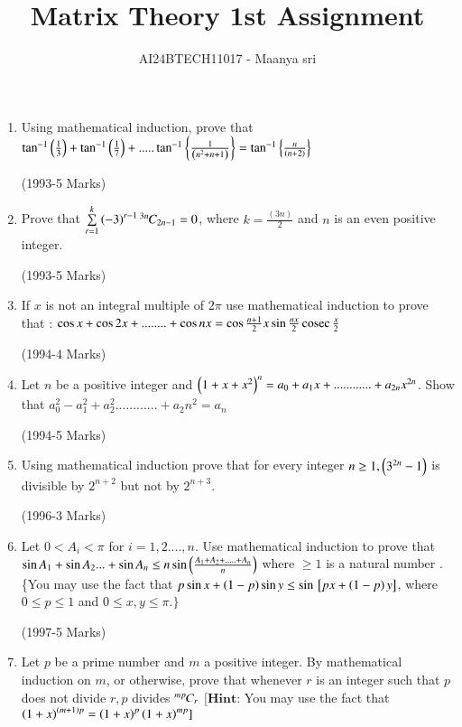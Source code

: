 \documentclass[journal,12pt,twocolumn]{IEEEtran}
\theoremstyle{remark}
\begin{document}

\vspace{3cm}

\title{Matrix Theory 1st Assignment}
\author{AI24BTECH11017 - Maanya sri}
\maketitle
\newpage
\bigskip

\renewcommand{\thefigure}{\theenumi}
\renewcommand{\thetable}{\theenumi}\begin{enumerate}[start=16] 
	\item Using mathematical induction, prove that $\tan^{-1}\left(\frac{1}{3}\right)  +  \tan^{-1}\left(\frac{1}{7}\right) + .....\tan^{-1}\left\{\frac{1}{\left(n^2 + n + 1\right)}\right\} = \tan^{-1}\left\{\frac{n}{\left(n+2\right)}\right\}$ 

		\hfill(1993-5 Marks) 
	\item Prove that $\sum\limits^{k}_{r=1} \left(-3\right)^{r-1} {{}^{3n}\mkern-1muC_{2n-1}} = 0$, where $k=\frac{(3n)}{2}$ and $n$ is an even positive integer.

	\hfill(1993-5 Marks)
\item If $x$ is not an integral multiple of $2\pi$ use mathematical induction to prove that : 
	$\cos{x} + \cos{2x} + ........ + \cos{nx} = \cos{\frac{n+1}{2}x}\sin{\frac{nx}{2}}\,\text{cosec}\,{\frac{x}{2}}$

		\hfill(1994-4 Marks)
\item 
Let $n$ be a positive integer and $\left(1+x+x^2\right)^n = a_0 + a_1 x + ............+ a_{2n} x^{2n}$. Show that $a_0^2 - a_1^2 + a_2^2 ............ + a_2n^2 = a_n$

		\hfill(1994-5 Marks)
\item 
Using mathematical induction prove that for every integer $n \geq 1 , \left(3^{2n} -1\right)$ is divisible by $2^{n+2}$ but not by $2^{n+3}$.

		\hfill(1996-3 Marks)
\item 
	Let $0<A_i<\pi$ for $i= 1,2....,n$. Use mathematical induction to prove that $\sin{A_1} + \sin{A_2}... + \sin{A_n} \leq  n \sin{\ensuremath{\left(\frac{A_1 + A_2 +.....+ A_n}{n}\right)}}$ where $\geq 1$ is a natural number .\{You may use the fact that $p \sin{x} + \left(1-p\right)\sin{y}\leq \sin{\ensuremath{{}\left[px + \left(1-p\right)y\right]}}$, where $0 \leq p \leq 1$ and $0 \leq x,y \leq \pi.\}$

		\hfill(1997-5 Marks)
\item 
Let $p$ be a prime number and $m$ a positive integer. By mathematical induction on $m$, or otherwise, prove that whenever $r$ is an integer such that $p$ does not divide $r , p$ divides ${{}^{mp}\mkern-1muC_{r}}$
		$[\textbf{Hint:}$ You may use the fact that $\left(1+x\right)^{\left(m+1\right)p} = \left(1+x\right)^p\left(1+x\right)^{mp}]$


\end{enumerate}
\end{document}

